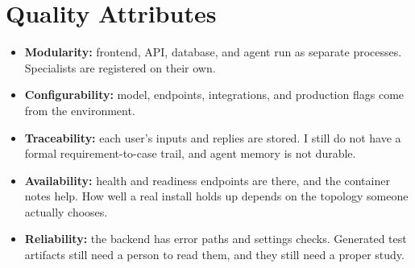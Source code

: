 \section{Quality Attributes}
\begin{itemize}
  \item \textbf{Modularity:} frontend, API, database, and agent run as separate processes. Specialists are registered on their own.
  \item \textbf{Configurability:} model, endpoints, integrations, and production flags come from the environment.
  \item \textbf{Traceability:} each user's inputs and replies are stored. I still do not have a formal requirement-to-case trail, and agent memory is not durable.
  \item \textbf{Availability:} health and readiness endpoints are there, and the container notes help. How well a real install holds up depends on the topology someone actually chooses.
  \item \textbf{Reliability:} the backend has error paths and settings checks. Generated test artifacts still need a person to read them, and they still need a proper study.
\end{itemize}
